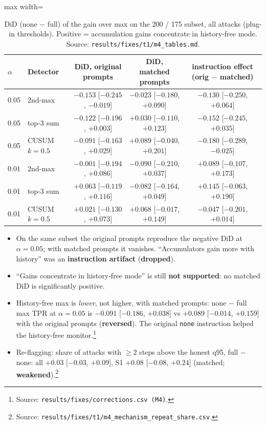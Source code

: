 \documentclass[11pt]{article}
\newcommand{\m}{\ensuremath{-}}
\newcommand{\src}[1]{\footnote{Source: \nolinkurl{#1}.}}
\newcommand{\vweak}{\textcolor{BurntOrange}{\textbf{weakened}}}
\newcommand{\vdrop}{\textcolor{BrickRed}{\textbf{dropped}}}
\newcommand{\vrev}{\textcolor{BrickRed}{\textbf{reversed}}}
\begin{document}
\begin{table}[!htbp]\centering\small
\begin{adjustbox}{max width=\linewidth}\begin{tabular}{@{}llccc@{}}
\toprule
$\alpha$ & Detector & DiD, original prompts & DiD, matched prompts & instruction effect (orig $-$ matched)\\
\midrule
0.05 & 2nd-max & $\m0.153$ [$\m0.245$, $\m0.019$] & $\m0.023$ [$\m0.180$, $+0.090$] & $\m0.130$ [$\m0.250$, $+0.064$]\\
0.05 & top-3 sum & $\m0.122$ [$\m0.196$, $+0.003$] & $+0.030$ [$\m0.110$, $+0.123$] & $\m0.152$ [$\m0.245$, $+0.035$]\\
0.05 & CUSUM $k{=}0.5$ & $\m0.091$ [$\m0.163$, $+0.029$] & $+0.089$ [$\m0.040$, $+0.201$] & $\m0.180$ [$\m0.289$, $\m0.025$]\\
0.01 & 2nd-max & $\m0.001$ [$\m0.194$, $+0.086$] & $\m0.090$ [$\m0.210$, $+0.037$] & $+0.089$ [$\m0.107$, $+0.173$]\\
0.01 & top-3 sum & $+0.063$ [$\m0.119$, $+0.116$] & $\m0.082$ [$\m0.164$, $+0.049$] & $+0.145$ [$\m0.063$, $+0.190$]\\
0.01 & CUSUM $k{=}0.5$ & $+0.021$ [$\m0.130$, $+0.073$] & $+0.068$ [$\m0.017$, $+0.149$] & $\m0.047$ [$\m0.201$, $+0.014$]\\
\bottomrule
\end{tabular}\end{adjustbox}
\caption{DiD (none $-$ full) of the gain over max on the 200 / 175 subset, all attacks (plug-in thresholds). Positive = accumulation gains concentrate in history-free mode. Source: \nolinkurl{results/fixes/t1/m4_tables.md}.}\label{tab:m4}
\end{table}

\begin{itemize}
\item On the same subset the original prompts reproduce the negative DiD at $\alpha=0.05$; with matched prompts it vanishes. ``Accumulators gain more with history'' was an \textbf{instruction artifact} (\vdrop).
\item ``Gains concentrate in history-free mode'' is still \textbf{not supported}: no matched DiD is significantly positive.
\item History-free max is \emph{lower}, not higher, with matched prompts: none $-$ full max TPR at $\alpha=0.05$ is $\m0.091$ [$\m0.186$, $+0.038$] vs $+0.089$ [$\m0.014$, $+0.159$] with the original prompts (\vrev). The original \texttt{none} instruction helped the history-free monitor.\src{results/fixes/corrections.csv (M4)}
\item Re-flagging: share of attacks with $\ge2$ steps above the honest q95, full $-$ none: all $+0.03$ [$\m0.03$, $+0.09$], S1 $+0.08$ [$\m0.08$, $+0.24$] (matched; \vweak).\src{results/fixes/t1/m4_mechanism_repeat_share.csv}
\end{itemize}
\end{document}
